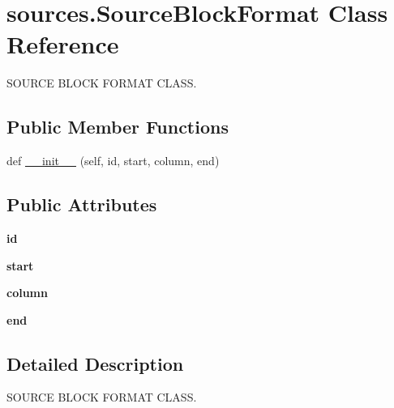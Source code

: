 \hypertarget{classsources_1_1_source_block_format}{}\section{sources.\+Source\+Block\+Format Class Reference}
\label{classsources_1_1_source_block_format}


S\+O\+U\+R\+CE B\+L\+O\+CK F\+O\+R\+M\+AT C\+L\+A\+SS.  


\subsection*{Public Member Functions}
\begin{DoxyCompactItemize}
\item 
def \hyperlink{classsources_1_1_source_block_format_a764ff2b86029ec36449dcd7c4f3dca31}{\+\_\+\+\_\+init\+\_\+\+\_\+} (self, id, start, column, end)
\end{DoxyCompactItemize}
\subsection*{Public Attributes}
\begin{DoxyCompactItemize}
\item 
\mbox{\label{classsources_1_1_source_block_format_af9700293768e74faf9bda49cf407ff99}} 
{\bfseries id}
\item 
\mbox{\label{classsources_1_1_source_block_format_a645ae8bcdc09b14da5c35fbcb2adf043}} 
{\bfseries start}
\item 
\mbox{\label{classsources_1_1_source_block_format_ae5bb9e416f6280d4e57557abffc87f0d}} 
{\bfseries column}
\item 
\mbox{\label{classsources_1_1_source_block_format_a1bec2ffda05f5947540b8b5005e99f27}} 
{\bfseries end}
\end{DoxyCompactItemize}


\subsection{Detailed Description}
S\+O\+U\+R\+CE B\+L\+O\+CK F\+O\+R\+M\+AT C\+L\+A\+SS. 

